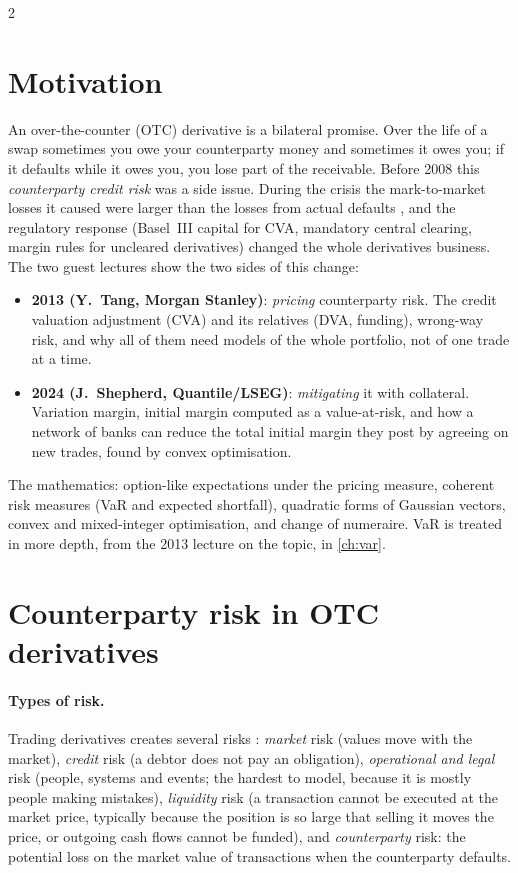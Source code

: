 \begin{paracol}{2}
\section*{Motivation}
An over-the-counter (OTC) derivative is a bilateral promise. Over the life of a swap sometimes you owe
your counterparty money and sometimes it owes you; if it defaults while it owes you, you lose part of the
receivable. Before 2008 this \emph{counterparty credit risk} was a side issue. During the crisis the
mark-to-market losses it caused were larger than the losses from actual defaults , and the
regulatory response (Basel~III capital for CVA, mandatory central clearing, margin rules for uncleared
derivatives) changed the whole derivatives business. The two guest lectures show the two sides of this change:
\begin{itemize}
  \item \textbf{2013 (Y.~Tang, Morgan Stanley)}: \emph{pricing} counterparty risk. The credit valuation
        adjustment (CVA) and its relatives (DVA, funding), wrong-way risk, and why all of them need models of
        the whole portfolio, not of one trade at a time.
  \item \textbf{2024 (J.~Shepherd, Quantile/LSEG)}: \emph{mitigating} it with collateral. Variation margin,
        initial margin computed as a value-at-risk, and how a network of banks can reduce the total initial
        margin they post by agreeing on new trades, found by convex optimisation.
\end{itemize}
The mathematics: option-like expectations under the pricing measure, coherent risk measures (VaR and
expected shortfall), quadratic forms of Gaussian vectors, convex and mixed-integer optimisation, and change of
numeraire. VaR is treated in more depth, from the 2013 lecture on the topic, in \cref{ch:var}.

\section{Counterparty risk in OTC derivatives}\label{ch08:sec-ccr}

\paragraph{Types of risk.} Trading derivatives creates several risks :
\emph{market} risk (values move with the market), \emph{credit} risk (a debtor does not pay an obligation),
\emph{operational and legal} risk (people, systems and events; the hardest to model, because it is mostly
people making mistakes), \emph{liquidity} risk (a transaction cannot be executed at the market price, typically
because the position is so large that selling it moves the price, or outgoing cash flows cannot be funded),
and \emph{counterparty} risk: the potential loss on the market value of transactions when the counterparty
defaults.


\end{paracol}
